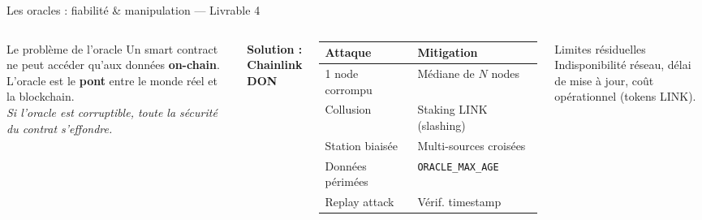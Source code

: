 \documentclass[aspectratio=169, 10pt, t]{beamer}
\begin{document}
\begin{frame}{Les oracles : fiabilité \& manipulation --- Livrable 4}
  \begin{columns}[c]
      \begin{block}{Le problème de l'oracle}
        \small
        Un smart contract ne peut accéder qu'aux données \textbf{on-chain}.
        L'oracle est le \textbf{pont} entre le monde réel et la blockchain.\\[4pt]
        \textcolor{AlertRed}{\itshape Si l'oracle est corruptible, toute la sécurité du contrat s'effondre.}
      \end{block}

      \vspace{0.3em}
      \textbf{Solution : Chainlink DON}


      \small
      \renewcommand{\arraystretch}{1.25}
      \begin{tabular}{@{}p{2.0cm}p{2.7cm}@{}}
        \toprule
        \textbf{Attaque} & \textbf{Mitigation} \\
        \midrule
        1 node corrompu & Médiane de $N$ nodes \\
        Collusion & Staking LINK (slashing) \\
        Station biaisée & Multi-sources croisées \\
        Données périmées & \texttt{\scriptsize ORACLE\_MAX\_AGE} \\
        Replay attack & Vérif. timestamp \\
        \bottomrule
      \end{tabular}

      \vspace{0.4em}
      \begin{alertblock}{\small Limites résiduelles}
        \small
        Indisponibilité réseau, délai de mise à jour, coût opérationnel (tokens LINK).
      \end{alertblock}
  \end{columns}
\end{frame}
\end{document}
